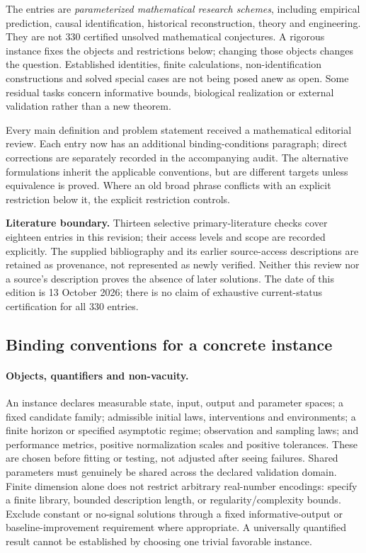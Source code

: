 \documentclass[11pt]{article}
\begin{document}
The entries are \emph{parameterized mathematical research schemes}, including empirical prediction, causal identification, historical reconstruction, theory and engineering. They are not 330 certified unsolved mathematical conjectures. A rigorous instance fixes the objects and restrictions below; changing those objects changes the question. Established identities, finite calculations, non-identification constructions and solved special cases are not being posed anew as open. Some residual tasks concern informative bounds, biological realization or external validation rather than a new theorem.

Every main definition and problem statement received a mathematical editorial review. Each entry now has an additional binding-conditions paragraph; direct corrections are separately recorded in the accompanying audit. The alternative formulations inherit the applicable conventions, but are different targets unless equivalence is proved. Where an old broad phrase conflicts with an explicit restriction below it, the explicit restriction controls.

\textbf{Literature boundary.} Thirteen selective primary-literature checks cover eighteen entries in this revision; their access levels and scope are recorded explicitly. The supplied bibliography and its earlier source-access descriptions are retained as provenance, not represented as newly verified. Neither this review nor a source's description proves the absence of later solutions. The date of this edition is 13 October 2026; there is no claim of exhaustive current-status certification for all 330 entries.

\subsection*{Binding conventions for a concrete instance}
\paragraph{Objects, quantifiers and non-vacuity.}
An instance declares measurable state, input, output and parameter spaces; a fixed candidate family; admissible initial laws, interventions and environments; a finite horizon or specified asymptotic regime; observation and sampling laws; and performance metrics, positive normalization scales and positive tolerances. These are chosen before fitting or testing, not adjusted after seeing failures. Shared parameters must genuinely be shared across the declared validation domain. Finite dimension alone does not restrict arbitrary real-number encodings: specify a finite library, bounded description length, or regularity/complexity bounds. Exclude constant or no-signal solutions through a fixed informative-output or baseline-improvement requirement where appropriate. A universally quantified result cannot be established by choosing one trivial favorable instance.
\end{document}
